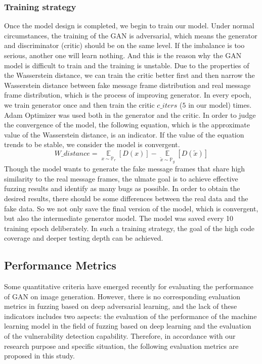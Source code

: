 \subsubsection{\textbf{Training strategy}}
Once the model design is completed, we begin to train our model. Under normal circumstances, the training of the GAN is adversarial, which means the generator and discriminator (critic) should be on the same level. If the imbalance is too serious, another one will learn nothing. And this is the reason why the GAN model is difficult to train and the training is unstable.
Due to the properties of the Wasserstein distance, we can train the critic better first and then narrow the Wasserstein distance between fake message frame distribution and real message frame distribution, which is the process of improving generator. In every epoch, we train generator once and then train the critic $c\_iters$ ($5$ in our model) times. Adam Optimizer was used both in the generator and the critic. In order to judge the convergence of the model, the following equation, which is the approximate value of the Wasserstein distance, is an indicator. If the value of the equation trends to be stable, we consider the model is convergent.
\begin{equation}
W\_distance = 
\mathop{\mathbb{E}}\limits_{x\sim\mathbb{P}_{r}}\left [ D(x) \right ] 
- \mathop{\mathbb{E}}\limits_{\tilde{x}\sim\mathbb{P}_{g}}\left [ D(\tilde{x}) \right ] 
\end{equation}
Though the model wants to generate the fake message frames that share high similarity to the real message frames, the ulmate goal is to achieve effective fuzzing results and identify as many bugs as possible. In order to obtain the desired results, there should be some differences between the real data and the fake data. So we not only save the final version of the model, which is convergent, but also the intermediate generator model. The model was saved every 10 training epoch deliberately. In such a training strategy, the goal of the high code coverage and deeper testing depth can be achieved.


\subsection{Performance Metrics}
Some quantitative criteria \cite{heusel2017gans} \cite{karras2017progressive} \cite{lucic2018gans} have emerged recently for evaluating the performance of GAN on image generation. However, there is no corresponding evaluation metrics in fuzzing based on deep adversarial learning, and the lack of these indicators includes two aspects: the evaluation of the performance of the machine learning model \cite{karras2017progressive} \cite{lucic2018gans} in the field of fuzzing based on deep learning \cite{shmelkov2018good} and the evaluation of the vulnerability detection capability. Therefore, in accordance with our research purpose and specific situation, the following evaluation metrics are proposed in this study.


